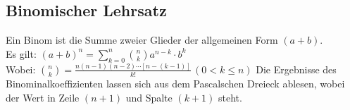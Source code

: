 \subsection{Binomischer Lehrsatz}
Ein Binom ist die Summe zweier Glieder der allgemeinen Form $(a + b)$.\\
Es gilt: $(a + b)^{n} = \sum_{k=0}^n{\binom{n}{k} a^{n-k} \cdot b^{k}}$\\
Wobei: $\binom{n}{k} = \frac{n(n - 1)(n - 2)\cdots[n - (k - 1)]}{k!}\,(0 < k \leq n)$
Die Ergebnisse des Binominalkoeffizienten lassen sich aus dem Pascalschen Dreieck ablesen, wobei der Wert in Zeile $(n + 1)$ und Spalte $(k + 1)$ steht.
